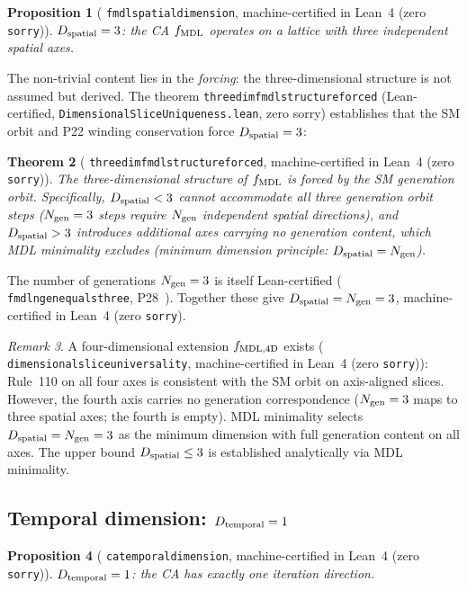 \documentclass[11pt]{article}
\newtheorem{theorem}{Theorem}[section]
\newtheorem{proposition}[theorem]{Proposition}
\theoremstyle{remark}
\newtheorem{remark}[theorem]{Remark}
\newcommand{\lean}[1]{%
  \penalty-100
  \begingroup\def\_{\textunderscore\allowbreak}\texttt{#1}\endgroup}
\newcommand{\CatAL}{machine-certified in Lean~4 (zero \texttt{sorry})}
\newcommand{\fmdl}{f_{\rm MDL}}
\newcommand{\Ngen}{N_{\rm gen}}
\begin{document}
\begin{proposition}[\lean{fmdl\_spatial\_dimension}, \CatAL]
\label{prop:dspatial}
$D_{\rm spatial} = 3$: the CA $\fmdl$ operates on a lattice with three
independent spatial axes.
\end{proposition}

The non-trivial content lies in the \emph{forcing}: the three-dimensional
structure is not assumed but derived.
The theorem \lean{three\_dim\_fmdl\_structure\_forced}
(Lean-certified, \lean{DimensionalSliceUniqueness.lean}, zero sorry)
establishes that the SM orbit and P22 winding conservation force $D_{\rm
spatial} = 3$:

\begin{theorem}[\lean{three\_dim\_fmdl\_structure\_forced}, \CatAL]
\label{thm:3d_forced}
The three-dimensional structure of $\fmdl$ is forced by the SM generation
orbit.
Specifically, $D_{\rm spatial} < 3$ cannot accommodate all three generation
orbit steps ($\Ngen = 3$ steps require $\Ngen$ independent spatial directions),
and $D_{\rm spatial} > 3$ introduces additional axes carrying no generation
content, which MDL minimality excludes (minimum dimension principle:
$D_{\rm spatial} = \Ngen$).
\end{theorem}

The number of generations $\Ngen = 3$ is itself Lean-certified
(\lean{fmdl\_ngen\_equals\_three}, P28~\cite{SpivackCompUniversality}).
Together these give $D_{\rm spatial} = \Ngen = 3$, \CatAL{}.

\begin{remark}
\label{rem:d4_extension}
A four-dimensional extension $f_{\rm MDL,4D}$ exists (\lean{dimensional\_slice\_universality},
\CatAL): Rule~110 on all four axes is consistent with the SM orbit on
axis-aligned slices.
However, the fourth axis carries no generation correspondence ($\Ngen = 3$
maps to three spatial axes; the fourth is empty).
MDL minimality selects $D_{\rm spatial} = \Ngen = 3$ as the minimum dimension
with full generation content on all axes.
The upper bound $D_{\rm spatial} \leq 3$ is established analytically via MDL minimality.
\end{remark}

\subsection{Temporal dimension: \texorpdfstring{$D_{\rm temporal} = 1$}{D\_temporal=1}}
\label{ssec:temporal_dim}

\begin{proposition}[\lean{ca\_temporal\_dimension}, \CatAL]
\label{prop:dtemporal}
$D_{\rm temporal} = 1$: the CA has exactly one iteration direction.
\end{proposition}
\end{document}
